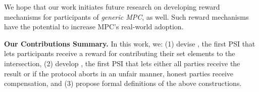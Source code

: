 We hope that our work initiates future research on developing reward mechanisms for participants of \emph{generic MPC}, as well. Such reward mechanisms have the potential to increase MPC's real-world adoption.  

\begin{paragraph}
%
{\textbf{Our Contributions Summary.}} In this work, we: (1) devise \withRew, the first PSI that lets participants receive a reward for contributing their set elements to the intersection, (2) develop \withFai, the first PSI that lets either all parties receive the result or if the protocol aborts in an unfair manner,  honest parties receive compensation, and (3) propose formal definitions of the above constructions.
%
\end{paragraph}










%












%













